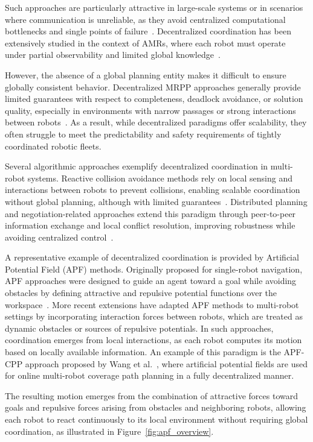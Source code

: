 Such approaches are particularly attractive in large-scale systems or in scenarios where
communication is unreliable, as they avoid centralized computational bottlenecks and single points
of failure~\cite{siefke2020systems}. Decentralized coordination has been extensively studied in the
context of AMRs, where each robot must operate under partial observability and
limited global knowledge~\cite{flocchini2000distributed}.

However, the absence of a global planning entity makes it difficult to ensure globally consistent
behavior. Decentralized MRPP approaches generally provide limited guarantees with respect to
completeness, deadlock avoidance, or solution quality, especially in environments with narrow
passages or strong interactions between robots~\cite{cap2015multi}. As a result, while
decentralized paradigms offer scalability, they often struggle to meet the predictability and safety
requirements of tightly coordinated robotic fleets.

Several algorithmic approaches exemplify decentralized coordination in multi-robot systems.
Reactive collision avoidance methods rely on local sensing and interactions between robots to
prevent collisions, enabling scalable coordination without global planning, although with limited
guarantees~\cite{van2008reciprocal}. Distributed planning and negotiation-related approaches
extend this paradigm through peer-to-peer information exchange and local conflict resolution,
improving robustness while avoiding centralized control~\cite{cap2015multi}.

A representative example of decentralized coordination is provided by Artificial Potential Field
(APF) methods. Originally proposed for single-robot navigation, APF approaches were designed to
guide an agent toward a goal while avoiding obstacles by defining attractive and repulsive
potential functions over the workspace~\cite{khatib1986real}. More recent extensions have adapted
APF methods to multi-robot settings by incorporating interaction forces between robots, which are
treated as dynamic obstacles or sources of repulsive potentials. In such approaches, coordination
emerges from local interactions, as each robot computes its motion based on locally available
information. An example of this paradigm is the APF-CPP approach proposed by Wang et
al.~\cite{wang2021apf_cpp}, where artificial potential fields are used for online multi-robot
coverage path planning in a fully decentralized manner.

The resulting motion emerges from the combination of attractive forces toward goals and repulsive
forces arising from obstacles and neighboring robots, allowing each robot to react continuously to
its local environment without requiring global coordination, as illustrated in
Figure~\ref{fig:apf_overview}.

